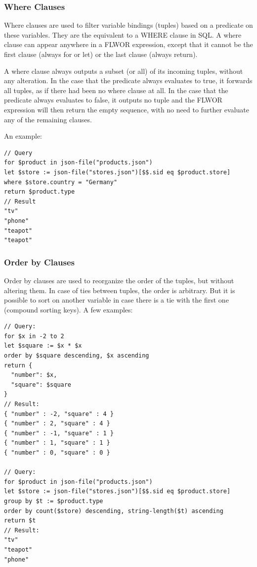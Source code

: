 \subsubsection{Where Clauses}
Where clauses are used to filter variable bindings (tuples) based on a predicate on these variables. They are the equivalent to a WHERE clause in SQL. A where clause can appear anywhere in a FLWOR expression, except that it cannot be the first clause (always for or let) or the last clause (always return).

A where clause always outputs a subset (or all) of its incoming tuples, without any alteration. In the case that the predicate always evaluates to true, it forwards all tuples, as if there had been no where clause at all. In the case that the predicate always evaluates to false, it outputs no tuple and the FLWOR expression will then return the empty sequence, with no need to further evaluate any of the remaining clauses.

An example:

\begin{lstlisting}[style=json]
// Query
for $product in json-file("products.json")
let $store := json-file("stores.json")[$$.sid eq $product.store]
where $store.country = "Germany"
return $product.type
// Result
"tv"
"phone"
"teapot"
"teapot"
\end{lstlisting}

\subsubsection{Order by Clauses}
Order by clauses are used to reorganize the order of the tuples, but without altering them. In case of ties between tuples, the order is arbitrary. But it is possible to sort on another variable in case there is a tie with the first one (compound sorting keys).
A few examples:

\begin{lstlisting}[style=json]
// Query:
for $x in -2 to 2
let $square := $x * $x
order by $square descending, $x ascending
return {
  "number": $x,
  "square": $square
}
// Result:
{ "number" : -2, "square" : 4 }
{ "number" : 2, "square" : 4 }
{ "number" : -1, "square" : 1 }
{ "number" : 1, "square" : 1 }
{ "number" : 0, "square" : 0 }

// Query:
for $product in json-file("products.json")
let $store := json-file("stores.json")[$$.sid eq $product.store]
group by $t := $product.type
order by count($store) descending, string-length($t) ascending
return $t
// Result:
"tv"
"teapot"
"phone"
\end{lstlisting}

